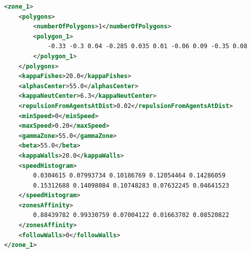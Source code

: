 \documentclass{styles/assisi}
\begin{document}
\begin{lstlisting}[caption={Control map area example},label={lst:model},language=xml]
<zone_1>
    <polygons>
        <numberOfPolygons>1</numberOfPolygons>
        <polygon_1>
            -0.33 -0.3 0.04 -0.285 0.035 0.01 -0.06 0.09 -0.35 0.08
        </polygon_1>
    </polygons>
    <kappaFishes>20.0</kappaFishes>
    <alphasCenter>55.0</alphasCenter>
    <kappaNeutCenter>6.3</kappaNeutCenter>
    <repulsionFromAgentsAtDist>0.02</repulsionFromAgentsAtDist>
    <minSpeed>0</minSpeed>
    <maxSpeed>0.20</maxSpeed>
    <gammaZone>55.0</gammaZone>
    <beta>55.0</beta>
    <kappaWalls>20.0</kappaWalls>
    <speedHistogram>
        0.0304615 0.07993734 0.10186769 0.12054464 0.14286059
        0.15312688 0.14098084 0.10748283 0.07632245 0.04641523
    </speedHistogram>
    <zonesAffinity>
        0.88439782 0.99330759 0.07004122 0.01663702 0.08520822
    </zonesAffinity>
    <followWalls>0</followWalls>
</zone_1>
\end{lstlisting}
\end{document}

